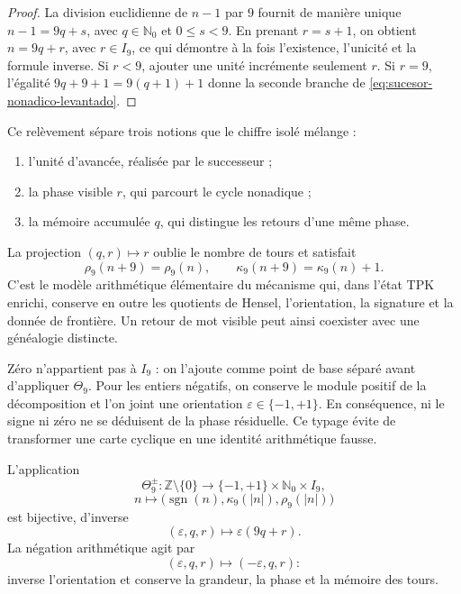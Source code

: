 \begin{proof}
La division euclidienne de \(n-1\) par \(9\) fournit de manière unique
\(n-1=9q+s\), avec \(q\in\mathbb N_0\) et \(0\leq s<9\). En prenant
\(r=s+1\), on obtient \(n=9q+r\), avec \(r\in I_9\), ce qui démontre à la fois
l'existence, l'unicité et la formule inverse. Si \(r<9\), ajouter une unité
incrémente seulement \(r\). Si \(r=9\), l'égalité
\(9q+9+1=9(q+1)+1\) donne la seconde branche de
\cref{eq:sucesor-nonadico-levantado}.
\end{proof}

Ce relèvement sépare trois notions que le chiffre isolé mélange :
\begin{enumerate}
\item l'unité d'avancée, réalisée par le successeur ;
\item la phase visible \(r\), qui parcourt le cycle nonadique ;
\item la mémoire accumulée \(q\), qui distingue les retours d'une même phase.
\end{enumerate}
La projection \((q,r)\mapsto r\) oublie le nombre de tours et satisfait
\[
 \rho_9(n+9)=\rho_9(n),
 \qquad
 \kappa_9(n+9)=\kappa_9(n)+1.
\]
C'est le modèle arithmétique élémentaire du mécanisme qui, dans l'état TPK
enrichi, conserve en outre les quotients de Hensel, l'orientation, la signature et la donnée
de frontière. Un retour de mot visible peut ainsi coexister avec une
généalogie distincte.

Zéro n'appartient pas à \(I_9\) : on l'ajoute comme point de base séparé avant
d'appliquer \(\Theta_9\). Pour les entiers négatifs, on conserve le module
positif de la décomposition et l'on joint une orientation
\(\varepsilon\in\{-1,+1\}\). En conséquence, ni le signe ni zéro ne se
déduisent de la phase résiduelle. Ce typage évite de transformer une carte
cyclique en une identité arithmétique fausse.

\begin{theorem}
\label{thm:entero-orientado-signo-genealogico}
L'application
\[
\Theta_9^\pm:
\mathbb Z\setminus\{0\}
\longrightarrow
\{-1,+1\}\times\mathbb N_0\times I_9,
\]
\[
n\longmapsto
\bigl(\operatorname{sgn}(n),
      \kappa_9(|n|),
      \rho_9(|n|)\bigr)
\]
est bijective, d’inverse
\[
(\varepsilon,q,r)\longmapsto\varepsilon(9q+r).
\]
La négation arithmétique agit par
\[
(\varepsilon,q,r)\longmapsto(-\varepsilon,q,r):
\]
inverse l'orientation et conserve la grandeur, la phase et la mémoire des tours.
\end{theorem}

